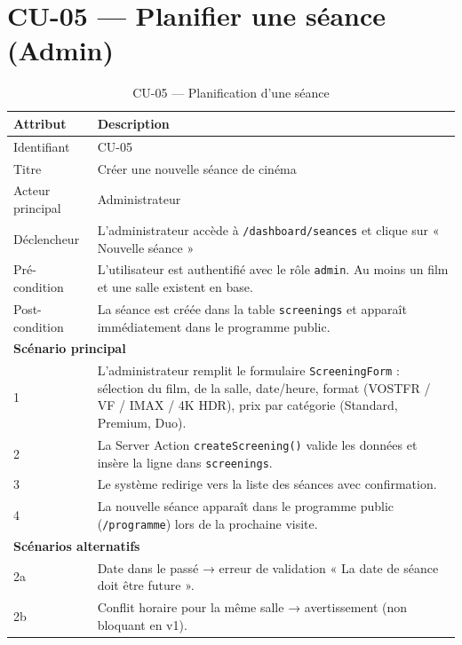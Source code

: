 \documentclass[12pt,a4paper,openany]{report}
\begin{document}
\section{CU-05 — Planifier une séance (Admin)}

\begin{table}[H]
\centering
\begin{tabularx}{\textwidth}{lX}
\toprule
\textbf{Attribut} & \textbf{Description} \\
\midrule
Identifiant        & CU-05 \\
Titre              & Créer une nouvelle séance de cinéma \\
Acteur principal   & Administrateur \\
Déclencheur        & L'administrateur accède à \texttt{/dashboard/seances} et clique sur « Nouvelle séance » \\
Pré-condition      & L'utilisateur est authentifié avec le rôle \texttt{admin}. Au moins un film et une salle existent en base. \\
Post-condition     & La séance est créée dans la table \texttt{screenings} et apparaît immédiatement dans le programme public. \\
\midrule
\multicolumn{2}{l}{\textbf{Scénario principal}} \\
\midrule
1 & L'administrateur remplit le formulaire \texttt{ScreeningForm} : sélection du film, de la salle, date/heure, format (VOSTFR / VF / IMAX / 4K HDR), prix par catégorie (Standard, Premium, Duo). \\
2 & La Server Action \texttt{createScreening()} valide les données et insère la ligne dans \texttt{screenings}. \\
3 & Le système redirige vers la liste des séances avec confirmation. \\
4 & La nouvelle séance apparaît dans le programme public (\texttt{/programme}) lors de la prochaine visite. \\
\midrule
\multicolumn{2}{l}{\textbf{Scénarios alternatifs}} \\
\midrule
2a & Date dans le passé → erreur de validation « La date de séance doit être future ». \\
2b & Conflit horaire pour la même salle → avertissement (non bloquant en v1). \\
\bottomrule
\end{tabularx}
\caption{CU-05 — Planification d'une séance}
\end{table}

\end{document}
